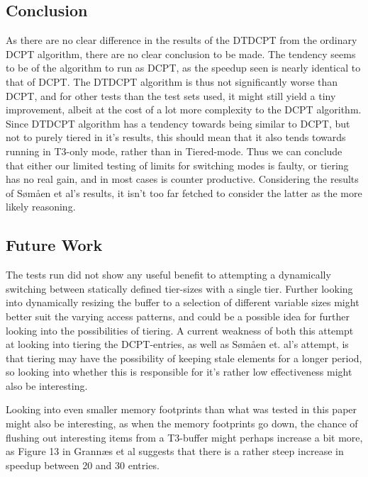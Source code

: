 \subsection{Conclusion}
As there are no clear difference in the results of the DTDCPT from the ordinary
DCPT algorithm, there are no clear conclusion to be made. The tendency seems to
be of the algorithm to run as DCPT, as the speedup seen is nearly identical to
that of DCPT. The DTDCPT algorithm is thus not significantly worse than DCPT, and for other
tests than the test sets used, it might still yield a tiny improvement, albeit at the cost
of a lot more complexity to the DCPT algorithm. Since DTDCPT algorithm has a tendency towards
being similar to DCPT, but not to purely tiered in it's results, this should mean that it also
tends towards running in T3-only mode, rather than in Tiered-mode. Thus we can conclude that either
our limited testing of limits for switching modes is faulty, or tiering has no real gain, and in most
cases is counter productive. Considering the results of Sømåen et al's results, it isn't too far fetched
to consider the latter as the more likely reasoning.

\subsection{Future Work}
The tests run did not show any useful benefit to attempting a dynamically switching
between statically defined tier-sizes with a single tier. Further looking into dynamically
resizing the buffer to a selection of different variable sizes might better suit the varying
access patterns, and could be a possible idea for further looking into the possibilities of tiering.
A current weakness of both this attempt at looking into tiering the DCPT-entries, as well as Sømåen
et. al's attempt, is that tiering may have the possibility of keeping stale elements for a longer period,
so looking into whether this is responsible for it's rather low effectiveness might also be interesting.

Looking into even smaller memory footprints than what was tested in this paper might also be interesting,
as when the memory footprints go down, the chance of flushing out interesting items from a T3-buffer might
perhaps increase a bit more, as Figure 13 in Grannæs et al suggests that there is a rather steep increase in
speedup between 20 and 30 entries.
